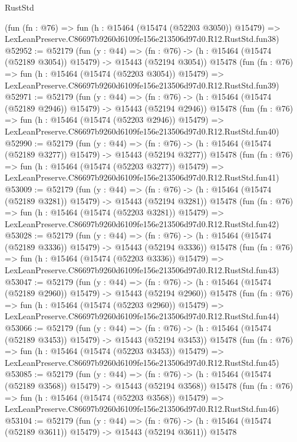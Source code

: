 \begin{lexlean}{RustStd}
\begin{coremodule}
    (fun (fn : @76) =>
    fun (h : @15464 (@15474 (@52203 @3050)) @15479) =>
    LexLeanPreserve.C86697b9260d6109fe156e213506d97d0.R12.RustStd.fun38)
@52952 := @52179
    (fun (y : @44) =>
    (fn : @76) -> (h : @15464 (@15474 (@52189 @3054)) @15479) -> @15443 (@52194 @3054))
    @15478
    (fun (fn : @76) =>
    fun (h : @15464 (@15474 (@52203 @3054)) @15479) =>
    LexLeanPreserve.C86697b9260d6109fe156e213506d97d0.R12.RustStd.fun39)
@52971 := @52179
    (fun (y : @44) =>
    (fn : @76) -> (h : @15464 (@15474 (@52189 @2946)) @15479) -> @15443 (@52194 @2946))
    @15478
    (fun (fn : @76) =>
    fun (h : @15464 (@15474 (@52203 @2946)) @15479) =>
    LexLeanPreserve.C86697b9260d6109fe156e213506d97d0.R12.RustStd.fun40)
@52990 := @52179
    (fun (y : @44) =>
    (fn : @76) -> (h : @15464 (@15474 (@52189 @3277)) @15479) -> @15443 (@52194 @3277))
    @15478
    (fun (fn : @76) =>
    fun (h : @15464 (@15474 (@52203 @3277)) @15479) =>
    LexLeanPreserve.C86697b9260d6109fe156e213506d97d0.R12.RustStd.fun41)
@53009 := @52179
    (fun (y : @44) =>
    (fn : @76) -> (h : @15464 (@15474 (@52189 @3281)) @15479) -> @15443 (@52194 @3281))
    @15478
    (fun (fn : @76) =>
    fun (h : @15464 (@15474 (@52203 @3281)) @15479) =>
    LexLeanPreserve.C86697b9260d6109fe156e213506d97d0.R12.RustStd.fun42)
@53028 := @52179
    (fun (y : @44) =>
    (fn : @76) -> (h : @15464 (@15474 (@52189 @3336)) @15479) -> @15443 (@52194 @3336))
    @15478
    (fun (fn : @76) =>
    fun (h : @15464 (@15474 (@52203 @3336)) @15479) =>
    LexLeanPreserve.C86697b9260d6109fe156e213506d97d0.R12.RustStd.fun43)
@53047 := @52179
    (fun (y : @44) =>
    (fn : @76) -> (h : @15464 (@15474 (@52189 @2960)) @15479) -> @15443 (@52194 @2960))
    @15478
    (fun (fn : @76) =>
    fun (h : @15464 (@15474 (@52203 @2960)) @15479) =>
    LexLeanPreserve.C86697b9260d6109fe156e213506d97d0.R12.RustStd.fun44)
@53066 := @52179
    (fun (y : @44) =>
    (fn : @76) -> (h : @15464 (@15474 (@52189 @3453)) @15479) -> @15443 (@52194 @3453))
    @15478
    (fun (fn : @76) =>
    fun (h : @15464 (@15474 (@52203 @3453)) @15479) =>
    LexLeanPreserve.C86697b9260d6109fe156e213506d97d0.R12.RustStd.fun45)
@53085 := @52179
    (fun (y : @44) =>
    (fn : @76) -> (h : @15464 (@15474 (@52189 @3568)) @15479) -> @15443 (@52194 @3568))
    @15478
    (fun (fn : @76) =>
    fun (h : @15464 (@15474 (@52203 @3568)) @15479) =>
    LexLeanPreserve.C86697b9260d6109fe156e213506d97d0.R12.RustStd.fun46)
@53104 := @52179
    (fun (y : @44) =>
    (fn : @76) -> (h : @15464 (@15474 (@52189 @3611)) @15479) -> @15443 (@52194 @3611))
    @15478

\end{coremodule}
\end{lexlean}
